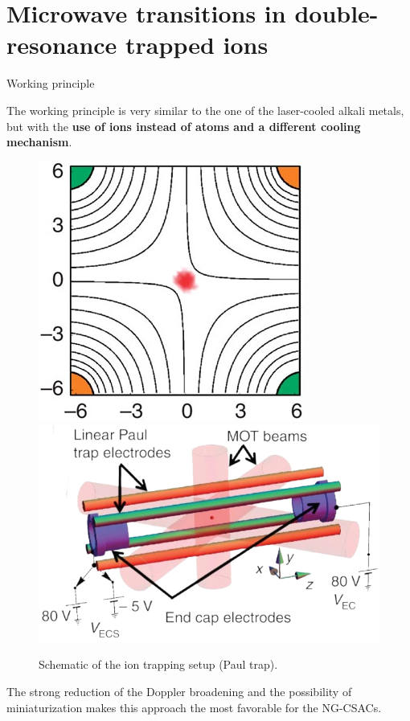 \section*{Microwave transitions in double-resonance trapped ions}

\begin{frame}{Working principle}

    The working principle is very similar to the one of the laser-cooled alkali metals, but with the \textbf{use of ions instead of atoms and a different cooling mechanism}.

    \begin{figure}
        \centering
        \includegraphics[height=0.4\textheight]{img/Paul-trapping-1.png}
        \hfill
        \includegraphics[height=0.4\textheight]{img/Paul-trapping-2.png}
        \caption{Schematic of the ion trapping setup (Paul trap).}
    \end{figure}

    The strong reduction of the Doppler broadening and the possibility of miniaturization makes this approach the most favorable for the NG-CSACs.

\end{frame}



